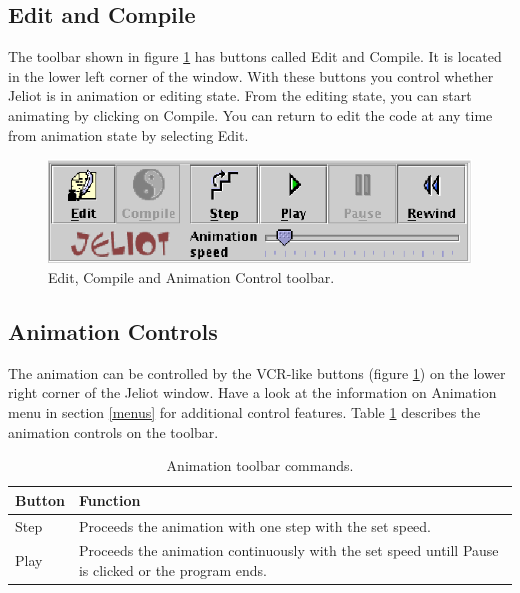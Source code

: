 \documentclass[a4paper,11pt,english]{article}
\newcommand{\jel}{Jeliot}
\newcommand{\bu}[1]{\textsf{#1}}
\newcommand{\menu}{\bu}
\begin{document}
{\subsection{Edit and Compile}
\label{edit_and_compile}

The toolbar shown in figure \ref{fig:animation_control} has buttons called \bu{Edit} and \bu{Compile}. It is located in the lower left corner of the window. With these buttons you control whether \jel{} is in animation or editing state. From the editing state, you can start animating by clicking on \bu{Compile}. You can return to edit the code at any time from animation state by selecting \bu{Edit}.

\begin{figure}[ht]
\begin{center}
\includegraphics{images/animation_controls.eps}
\caption{\label{fig:animation_control}Edit, Compile and Animation Control toolbar.}
\end{center}
\end{figure}

\subsection{Animation Controls}
\label{animation_controls}
The animation can be controlled by the VCR-like buttons (figure \ref{fig:animation_control}) on the lower right corner of the \jel{} window. Have a look at the information on \menu{Animation} menu in section \ref{menus} for additional control features. Table \ref{tbl:commands} describes the animation controls on the toolbar.

\begin{table}[h]
\begin{center}
\caption{\label{tbl:commands}Animation toolbar commands.}

\begin{tabular}{l|p{100mm}}
\hline
\textbf{Button} & \textbf{Function} \\
\hline
\bu{Step} & Proceeds the animation with one step with the set speed. \\

\bu{Play} & Proceeds the animation continuously with the set speed untill \bu{Pause} is clicked or the program ends.\\


\end{tabular}
\end{center}
\end{table}}
\end{document}
